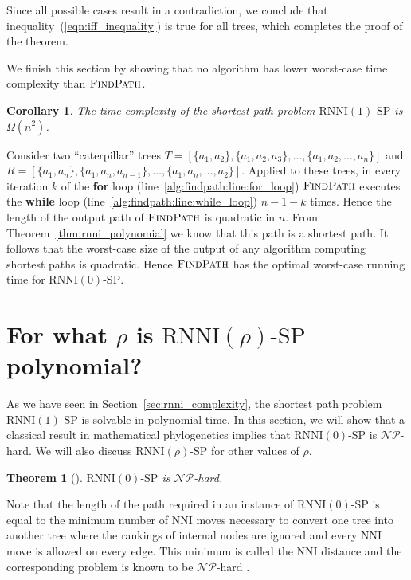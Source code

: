 \documentclass[11pt]{amsart}
\newtheorem{theorem}{Theorem}
\newtheorem{corollary}{Corollary}
\newcommand{\rnni}{\mathrm{RNNI}}
\newcommand{\findpath}{\textsc{FindPath}}
\newcommand{\nni}{\mathrm{NNI}}
\newcommand{\np}{\mathcal{NP}}
\newcommand{\decprob}[1]{\rnni(#1)\text{-}\mathrm{SP}}
\begin{document}
Since all possible cases result in a contradiction, we conclude that inequality~(\ref{eqn:iff_inequality}) is true for all trees, which completes the proof of the theorem.
\endproof

We finish this section by showing that no algorithm has lower worst-case time complexity than $\findpath$.

\begin{corollary}
The time-complexity of the shortest path problem $\decprob{1}$ is $\Omega(n^2)$.
\end{corollary}

\proof
Consider two ``caterpillar'' trees $T = [\{a_1, a_2\}, \{a_1, a_2, a_3\}, \ldots, \{a_1, a_2, \ldots, a_n\}]$ and\\
$R = [\{a_1,a_n\}, \{a_1, a_n, a_{n-1}\}, \ldots, \{a_1, a_n, \ldots, a_2\}]$.
Applied to these trees, in every iteration $k$ of the \textbf{for} loop (line~\ref{alg:findpath:line:for_loop}) $\findpath$ executes the \textbf{while} loop (line~\ref{alg:findpath:line:while_loop}) $n-1-k$ times.
Hence the length of the output path of $\findpath$ is quadratic in $n$.
From Theorem~\ref{thm:rnni_polynomial} we know that this path is a shortest path.
It follows that the worst-case size of the output of any algorithm computing shortest paths is quadratic.
Hence $\findpath$ has the optimal worst-case running time for $\decprob{0}$.
\endproof


\section{For what $\rho$ is $\decprob{\rho}$ polynomial?}

As we have seen in Section~\ref{sec:rnni_complexity}, the shortest path problem $\decprob{1}$ is solvable in polynomial time.
In this section, we will show that a classical result in mathematical phylogenetics implies that $\decprob{0}$ is $\np$-hard.
We will also discuss $\decprob{\rho}$ for other values of $\rho$.

\begin{theorem}[\textcite{Dasgupta2000-xa}]
$\decprob{0}$ is $\np$-hard.
\label{thm:nni_hard}
\end{theorem}

\proof
Note that the length of the path required in an instance of $\decprob{0}$ is equal to the minimum number of $\nni$ moves necessary to convert one tree into another tree where the rankings of internal nodes are ignored and every $\nni$ move is allowed on every edge.
This minimum is called the $\nni$ distance and the corresponding problem is known to be $\np$-hard \autocite{Dasgupta2000-xa}.
\endproof
\end{document}
